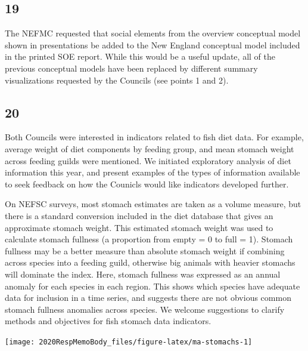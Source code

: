 \documentclass[
  10pt,
]{article}
\let\origfigure\figure
\let\endorigfigure\endfigure
\renewenvironment{figure}[1][2] {
    \expandafter\origfigure\expandafter[H]
} {
    \endorigfigure
}
\begin{document}
\hypertarget{section-18}{%
\subsection{19}\label{section-18}}

The NEFMC requested that social elements from the overview conceptual
model shown in presentations be added to the New England conceptual
model included in the printed SOE report. While this would be a useful
update, all of the previous conceptual models have been replaced by
different summary visualizations requested by the Councils (see points 1
and 2).

\hypertarget{section-19}{%
\subsection{20}\label{section-19}}

Both Councils were interested in indicators related to fish diet data.
For example, average weight of diet components by feeding group, and
mean stomach weight across feeding guilds were mentioned. We initiated
exploratory analysis of diet information this year, and present examples
of the types of information available to seek feedback on how the
Counicls would like indicators developed further.

On NEFSC surveys, most stomach estimates are taken as a volume measure,
but there is a standard conversion included in the diet database that
gives an approximate stomach weight. This estimated stomach weight was
used to calculate stomach fullness (a proportion from empty = 0 to full
= 1). Stomach fullness may be a better measure than absolute stomach
weight if combining across species into a feeding guild, otherwise big
animals with heavier stomachs will dominate the index. Here, stomach
fullness was expressed as an annual anomaly for each species in each
region. This shows which species have adequate data for inclusion in a
time series, and suggests there are not obvious common stomach fullness
anomalies across species. We welcome suggestions to clarify methods and
objectives for fish stomach data indicators.

\begin{figure}

{\centering \texttt{[image: 2020RespMemoBody\_files/figure-latex/ma-stomachs-1]} 

}

\caption{Stomach fullness anomaly in the Mid-Atlantic Bight.}\label{fig:ma-stomachs}
\end{figure}
\end{document}
